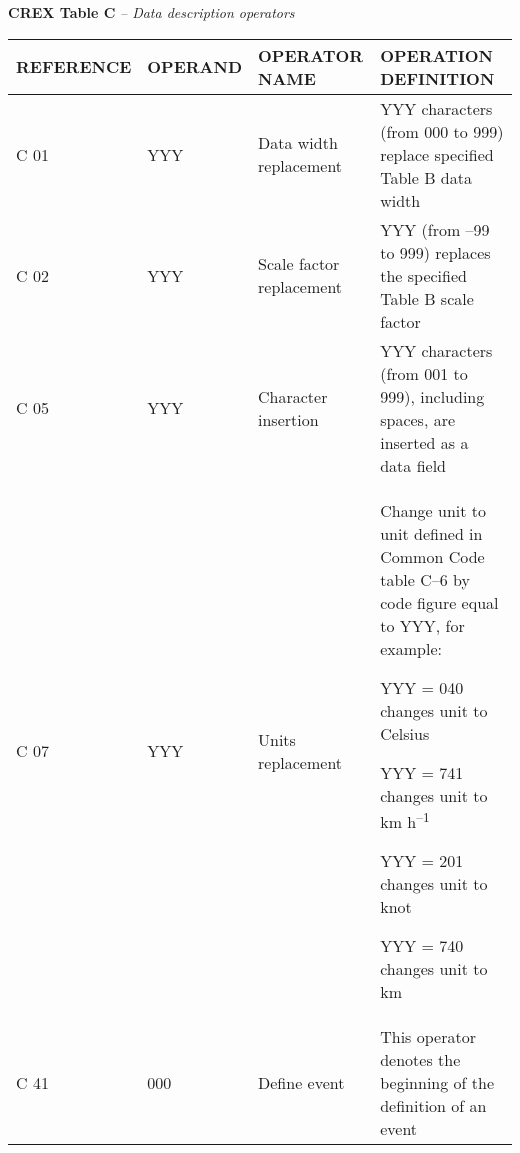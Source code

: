 \textbf{CREX Table C} \emph{-- Data description operators}

\begin{longtable}[]{@{}llll@{}}
\toprule
REFERENCE & OPERAND & OPERATOR NAME & OPERATION DEFINITION\tabularnewline
\midrule
\endhead
C 01 & YYY & Data width replacement & YYY characters (from 000 to 999) replace specified Table B data width\tabularnewline
C 02 & YYY & Scale factor replacement & YYY (from --99 to 999) replaces the specified Table B scale factor\tabularnewline
C 05 & YYY & Character insertion & YYY characters (from 001 to 999), including spaces, are inserted as a data field\tabularnewline
\begin{minipage}[t]{0.22\columnwidth}\raggedright
C 07\strut
\end{minipage} & \begin{minipage}[t]{0.22\columnwidth}\raggedright
YYY\strut
\end{minipage} & \begin{minipage}[t]{0.22\columnwidth}\raggedright
Units replacement\strut
\end{minipage} & \begin{minipage}[t]{0.22\columnwidth}\raggedright
Change unit to unit defined in Common Code table C--6 by code figure equal to YYY, for example:

YYY = 040 changes unit to Celsius

YYY = 741 changes unit to km h\textsuperscript{--1}

YYY = 201 changes unit to knot

YYY = 740 changes unit to km\strut
\end{minipage}\tabularnewline
\begin{minipage}[t]{0.22\columnwidth}\raggedright
C 41\strut
\end{minipage} & \begin{minipage}[t]{0.22\columnwidth}\raggedright
000\strut
\end{minipage} & \begin{minipage}[t]{0.22\columnwidth}\raggedright
Define event\strut
\end{minipage} & \begin{minipage}[t]{0.22\columnwidth}\raggedright
This operator denotes the beginning of the definition of an event


\end{minipage}
\end{longtable}
